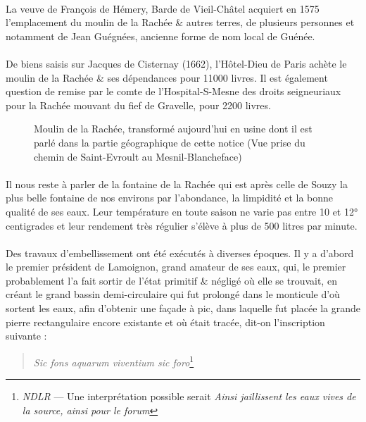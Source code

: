 \documentclass[../eBook.tex]{subfiles}
\begin{document}
      \paragraph{}La veuve de François de Hémery, Barde de Vieil-Châtel acquiert en 1575 l'emplacement du moulin de la Rachée \& autres terres, de plusieurs personnes et notamment de Jean Guégnées, ancienne forme de nom local de Guénée.
      \paragraph{}De biens saisis sur Jacques de Cisternay (1662), l'Hôtel-Dieu de Paris achète le moulin de la Rachée \& ses dépendances pour 11000 livres. Il est également question de remise par le comte de l'Hospital-S-Mesne des droits seigneuriaux pour la Rachée mouvant du fief de Gravelle, pour 2200 livres.
      \begin{center}
        \begin{figure}[!ht]
          \captionsetup{justification=centering}
          \caption*{Moulin de la Rachée, transformé aujourd'hui en usine dont il est parlé dans la partie géographique de cette notice (Vue prise du chemin de Saint-Evroult au Mesnil-Blancheface)}
        \end{figure}
      \end{center}
      \paragraph{}Il nous reste à parler de la fontaine de la Rachée qui est après celle de Souzy la plus belle fontaine de nos environs par l'abondance, la limpidité et la bonne qualité de ses eaux. Leur température en toute saison ne varie pas entre 10 et 12° centigrades et leur rendement très régulier s'élève à plus de 500 litres par minute.
      \paragraph{}Des travaux d'embellissement ont été exécutés à diverses époques. Il y a d'abord le premier président de Lamoignon, grand amateur de ses eaux, qui, le premier probablement l'a fait sortir de l'état primitif \& négligé où elle se trouvait, en créant le grand bassin demi-circulaire qui fut prolongé dans le monticule d'où sortent les eaux, afin d'obtenir une façade à pic, dans laquelle fut placée la grande pierre rectangulaire encore existante et où était tracée, dit-on l'inscription suivante :
      \begin{quote}
        \og \textit{Sic fons aquarum viventium sic foro}\fg{}\footnote{\textit{NDLR} --- Une interprétation possible serait \og \textit{Ainsi jaillissent les eaux vives de la source, ainsi pour le forum}\fg{}}
      \end{quote}
\end{document}
